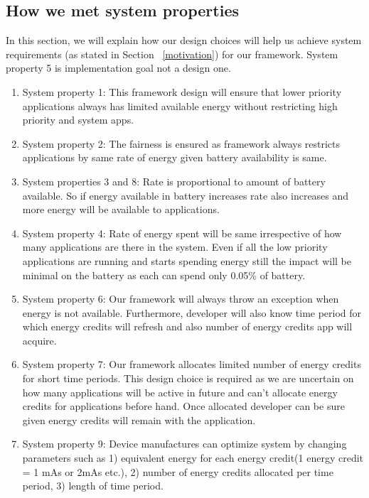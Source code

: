 \subsection{How we met system properties}


In this section, we will explain how our design choices will help us achieve system requirements (as stated in Section ~\ref{motivation}) for our framework. System property 5 is implementation goal not a design one.

\begin{enumerate}

\item  System property 1: This framework design will ensure that lower priority applications always has limited available energy without restricting high priority and system apps.

\item  System property 2: The fairness is ensured as framework always restricts applications by same rate of energy given battery availability is same. 

\item  System properties 3 and 8: Rate is proportional to amount of battery available. So if energy available in battery increases rate also increases and more energy will be available to applications.

\item System property 4: Rate of energy spent will be same irrespective of how many applications are there in the system. Even if all the low priority applications are running and starts spending energy still the impact will be minimal on the battery as each can spend only 0.05\% of battery.

\item System property 6: Our framework will always throw an exception when energy is not available. Furthermore, developer will also know time period for which energy credits will refresh and also number of energy credits app will acquire.

\item System property 7: Our framework allocates limited number of energy credits for short time periods. This design choice is required as we are uncertain on how many applications will be active in future and can't allocate energy credits for applications before hand. Once allocated developer can be sure given energy credits will remain with the application.

\item System property 9: Device manufactures can optimize system by changing parameters such as 1) equivalent energy for each energy credit(1 energy credit = 1 mAs or 2mAs etc.), 2) number of energy credits allocated per time period, 3) length of time period. 

\end{enumerate}

